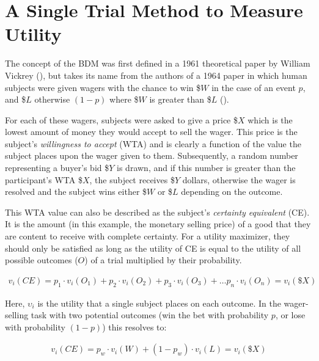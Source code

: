 \clearpage
\section{A Single Trial Method to Measure Utility}

The concept of the BDM was first defined in a 1961 theoretical paper by William Vickrey (\cite{vickreyCounterspeculationAuctionsCompetitive1961}), but takes its name from the authors of a 1964 paper in which human subjects were given wagers with the chance to win \$$W$ in the case of an event $p$, and \$$L$ otherwise $(1-p)$ where \$$W$ is greater than \$$L$ (\cite{beckerMeasuringUtilitySingleresponse1964}).

For each of these wagers, subjects were asked to give a price \$$X$ which is the lowest amount of money they would accept to sell the wager. This price is the subject’s \textit{willingness to accept} (WTA) and is clearly a function of the value the subject places upon the wager given to them. Subsequently, a random number representing a buyer’s bid \$$Y$ is drawn, and if this number is greater than the participant’s WTA \$$X$, the subject receives \$$Y$ dollars, otherwise the wager is resolved and the subject wins either \$$W$ or \$$L$ depending on the outcome.

This WTA value can also be described as the subject’s \textit{certainty equivalent} (CE). It is the amount (in this example, the monetary selling price) of a good that they are content to receive with complete certainty. For a utility maximizer, they should only be satisfied as long as the utility of CE is equal to the utility of all possible outcomes ($O$) of a trial multiplied by their probability.

\begin{equation}
\begin{aligned}
v_i(CE) = p_1 \cdot v_i(O_1) + p_2 \cdot v_i(O_2) + p_3 \cdot v_i(O_3) + \ldots p_n \cdot v_i(O_n) = v_i(\$X)
\end{aligned}
\label{eq:bdm1}
\end{equation}

Here, $\upsilon_i$ is the utility that a single subject places on each outcome. In the wager-selling task with two potential outcomes (win the bet with probability $p$, or lose with probability $(1-p)$) this resolves to:

\begin{equation}
\begin{aligned}
v_i(CE) = p_w \cdot v_i(W) + (1 - p_w) \cdot v_i(L) = v_i(\$X)
\end{aligned}
\label{eq:bdm2}
\end{equation}

